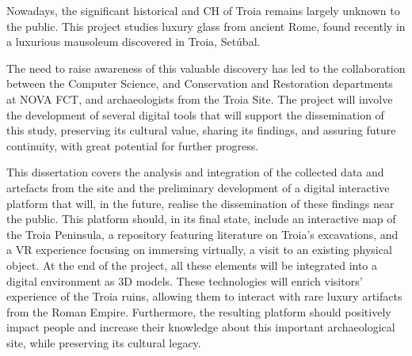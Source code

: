 
Nowadays, the significant historical and \gls{CH} of Troia remains largely unknown to the public. This project studies luxury glass from ancient Rome, found recently in a luxurious mausoleum discovered in Troia, Setúbal.  

The need to raise awareness of this valuable discovery has led to the collaboration between the Computer Science, and Conservation and Restoration departments at NOVA FCT, and archaeologists from the Troia Site. The project will involve the development of several digital tools that will support the dissemination of this study, preserving its cultural value, sharing its findings, and assuring future continuity, with great potential for further progress.  

This dissertation covers the analysis and integration of the collected data and artefacts from the site and the preliminary development of a digital interactive platform that will, in the future, realise the dissemination of these findings near the public. This platform should, in its final state, include an interactive map of the Troia Peninsula, a repository featuring literature on Troia’s excavations, and a \gls{VR} experience focusing on immersing virtually, a visit to an existing physical object. At the end of the project, all these elements will be integrated into a digital environment as \gls{3D} models. These technologies will enrich visitors' experience of the Troia ruins, allowing them to interact with rare luxury artifacts from the Roman Empire. Furthermore, the resulting platform should positively impact people and increase their knowledge about this important archaeological site, while preserving its cultural legacy. 



